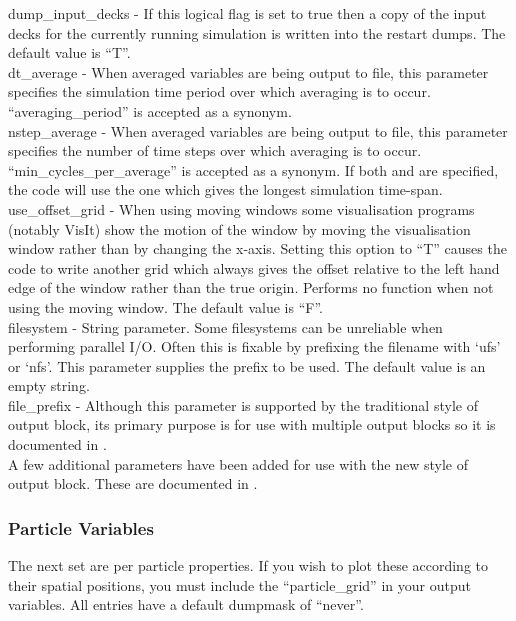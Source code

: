 {\emphtext dump\_input\_decks} - If this logical flag is set to true then
a copy of the input decks for the currently running simulation is written
into the restart dumps. The default value is ``T''.\\

{\emphtext dt\_average} - When averaged variables are being output to
file, this parameter specifies the simulation time period over which
averaging is to occur. ``averaging\_period'' is accepted as a synonym.\\

{\emphtext nstep\_average} - When averaged variables are being output to
file, this parameter specifies the number of time steps over which
averaging is to occur. ``min\_cycles\_per\_average'' is accepted as a synonym.
If both  and  are specified,
the code will use the one which gives the longest simulation time-span.\\

{\emphtext use\_offset\_grid} - When using moving windows some visualisation
programs (notably VisIt) show the motion of the window by moving the
visualisation window rather than by changing the x-axis. Setting this option to
``T'' causes the code to write another grid which always gives the offset
relative to the left hand edge of the window rather than the true origin.
Performs no function when not using the moving window. The default value
is ``F''.\\

{\emphtext filesystem} - String parameter. Some filesystems can be unreliable
when performing parallel I/O. Often this is fixable by prefixing the filename
with `ufs' or `nfs'. This parameter supplies the prefix to be used. The
default value is an empty string.\\

{\emphtext file\_prefix} - Although this parameter is supported by the
traditional style of output block, its primary purpose is for use with
multiple output blocks so it is documented in .\\

A few additional parameters have been added for use with the new style of
output block. These are documented in .

\subsubsection{Particle Variables}
The next set are per particle properties. If you wish to plot these according
to their spatial positions, you must include the ``particle\_grid'' in your
output variables. All entries have a default dumpmask of ``never''.\\

